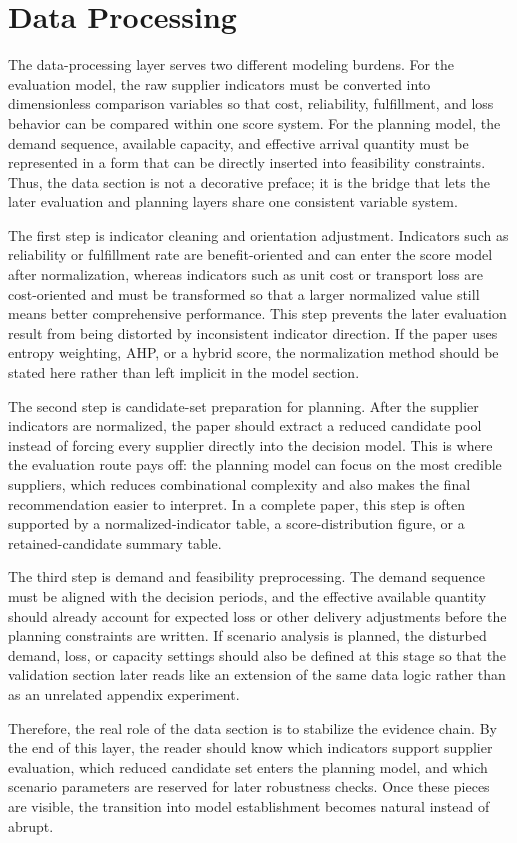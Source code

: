 \section{Data Processing}

The data-processing layer serves two different modeling burdens. For the evaluation model, the raw supplier indicators must be converted into dimensionless comparison variables so that cost, reliability, fulfillment, and loss behavior can be compared within one score system. For the planning model, the demand sequence, available capacity, and effective arrival quantity must be represented in a form that can be directly inserted into feasibility constraints. Thus, the data section is not a decorative preface; it is the bridge that lets the later evaluation and planning layers share one consistent variable system.

The first step is indicator cleaning and orientation adjustment. Indicators such as reliability or fulfillment rate are benefit-oriented and can enter the score model after normalization, whereas indicators such as unit cost or transport loss are cost-oriented and must be transformed so that a larger normalized value still means better comprehensive performance. This step prevents the later evaluation result from being distorted by inconsistent indicator direction. If the paper uses entropy weighting, AHP, or a hybrid score, the normalization method should be stated here rather than left implicit in the model section.

The second step is candidate-set preparation for planning. After the supplier indicators are normalized, the paper should extract a reduced candidate pool instead of forcing every supplier directly into the decision model. This is where the evaluation route pays off: the planning model can focus on the most credible suppliers, which reduces combinational complexity and also makes the final recommendation easier to interpret. In a complete paper, this step is often supported by a normalized-indicator table, a score-distribution figure, or a retained-candidate summary table.

The third step is demand and feasibility preprocessing. The demand sequence must be aligned with the decision periods, and the effective available quantity should already account for expected loss or other delivery adjustments before the planning constraints are written. If scenario analysis is planned, the disturbed demand, loss, or capacity settings should also be defined at this stage so that the validation section later reads like an extension of the same data logic rather than as an unrelated appendix experiment.

Therefore, the real role of the data section is to stabilize the evidence chain. By the end of this layer, the reader should know which indicators support supplier evaluation, which reduced candidate set enters the planning model, and which scenario parameters are reserved for later robustness checks. Once these pieces are visible, the transition into model establishment becomes natural instead of abrupt.

